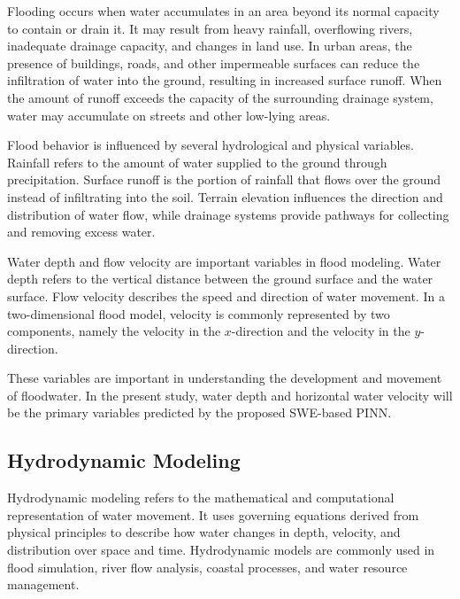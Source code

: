 Flooding occurs when water accumulates in an area beyond its normal capacity to contain or drain it. It may result from heavy rainfall, overflowing rivers, inadequate drainage capacity, and changes in land use. In urban areas, the presence of buildings, roads, and other impermeable surfaces can reduce the infiltration of water into the ground, resulting in increased surface runoff. When the amount of runoff exceeds the capacity of the surrounding drainage system, water may accumulate on streets and other low-lying areas.

Flood behavior is influenced by several hydrological and physical variables. Rainfall refers to the amount of water supplied to the ground through precipitation. Surface runoff is the portion of rainfall that flows over the ground instead of infiltrating into the soil. Terrain elevation influences the direction and distribution of water flow, while drainage systems provide pathways for collecting and removing excess water.

Water depth and flow velocity are important variables in flood modeling. Water depth refers to the vertical distance between the ground surface and the water surface. Flow velocity describes the speed and direction of water movement. In a two-dimensional flood model, velocity is commonly represented by two components, namely the velocity in the $x$-direction and the velocity in the $y$-direction.

These variables are important in understanding the development and movement of floodwater. In the present study, water depth and horizontal water velocity will be the primary variables predicted by the proposed SWE-based PINN.

\subsection{Hydrodynamic Modeling}


Hydrodynamic modeling refers to the mathematical and computational representation of water movement. It uses governing equations derived from physical principles to describe how water changes in depth, velocity, and distribution over space and time. Hydrodynamic models are commonly used in flood simulation, river flow analysis, coastal processes, and water resource management.


